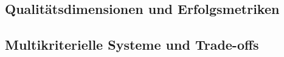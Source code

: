 \subsection{Qualitätsdimensionen und Erfolgsmetriken}

\subsection{Multikriterielle Systeme und Trade-offs}

